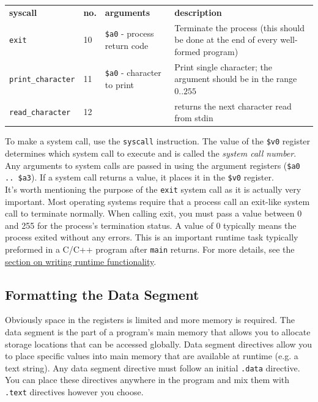 \documentclass[12pt]{article}
\begin{document}
\begin{tabular}{p{} || p{} | p{} | p{}}
    \textbf{syscall} & \textbf{no.} & \textbf{arguments} &
     \textbf{description} \\ \hhline{=#=|=|=}

    \texttt{exit} & 10 & \texttt{\$a0} - process return code & Terminate the
     process (this should be done at the end of every well-formed program)
     \\ \hline

    \texttt{print\_character} & 11 & \texttt{\$a0} - character to print & Print
     single character; the argument should be in the range $0..255$ \\ \hline

    \texttt{read\_character} & 12 & & returns the next character read from stdin\\
\end{tabular}

\vspace{0.25in}
To make a system call, use the \texttt{syscall} instruction. The value of the
     \texttt{\$v0} register determines which system call to execute and is
     called the \textit{system call number}. Any arguments to system calls are
     passed in using the argument registers (\texttt{\$a0 .. \$a3}). If a system
     call returns a value, it places it in the \texttt{\$v0} register.\\

It's worth mentioning the purpose of the \texttt{exit} system call as it is
     actually very important. Most operating systems require that a process call
     an exit-like system call to terminate normally. When calling exit, you must
     pass a value between 0 and 255 for the process's termination status. A
     value of 0 typically means the process exited without any errors. This is
     an important runtime task typically preformed in a C/C++ program after
     \texttt{main} returns. For more details, see the
     \hyperref[sec:runtime]{section on writing runtime functionality}.

\subsection{Formatting the Data Segment}

Obviously space in the registers is limited and more memory is required. The
     data segment is the part of a program's main memory that allows you to
     allocate storage locations that can be accessed globally. Data segment
     directives allow you to place specific values into main memory that are
     available at runtime (e.g. a text string). Any data segment directive must
     follow an initial \texttt{.data} directive. You can place these directives
     anywhere in the program and mix them with \texttt{.text} directives however
     you choose.\\
\end{document}
